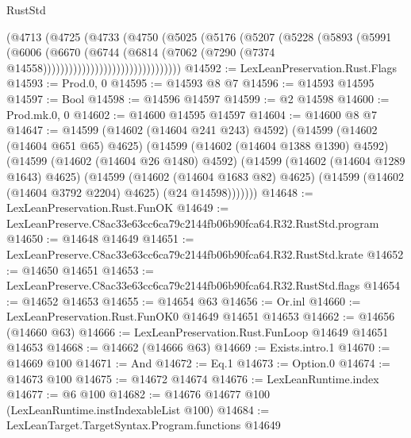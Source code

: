 \begin{lexlean}{RustStd}
\begin{coremodule}
                                  (@4713
                                    (@4725
                                      (@4733
                                        (@4750
                                          (@5025
                                            (@5176
                                              (@5207
                                                (@5228
                                                  (@5893
                                                    (@5991
                                                      (@6006
                                                        (@6670
                                                          (@6744
                                                            (@6814
                                                              (@7062
                                                                (@7290
                                                                  (@7374
                                                                    @14558))))))))))))))))))))))))))))))))
@14592 := LexLeanPreservation.Rust.Flags
@14593 := Prod.{0, 0}
@14595 := @14593 @8 @7
@14596 := @14593 @14595
@14597 := Bool
@14598 := @14596 @14597
@14599 := @2 @14598
@14600 := Prod.mk.{0, 0}
@14602 := @14600 @14595 @14597
@14604 := @14600 @8 @7
@14647 := @14599
    (@14602 (@14604 @241 @243) @4592)
    (@14599
      (@14602 (@14604 @651 @65) @4625)
      (@14599
        (@14602 (@14604 @1388 @1390) @4592)
        (@14599
          (@14602 (@14604 @26 @1480) @4592)
          (@14599
            (@14602 (@14604 @1289 @1643) @4625)
            (@14599
              (@14602 (@14604 @1683 @82) @4625)
              (@14599 (@14602 (@14604 @3792 @2204) @4625) (@24 @14598)))))))
@14648 := LexLeanPreservation.Rust.FunOK
@14649 := LexLeanPreserve.C8ac33e63cc6ca79c2144fb06b90fca64.R32.RustStd.program
@14650 := @14648 @14649
@14651 := LexLeanPreserve.C8ac33e63cc6ca79c2144fb06b90fca64.R32.RustStd.krate
@14652 := @14650 @14651
@14653 := LexLeanPreserve.C8ac33e63cc6ca79c2144fb06b90fca64.R32.RustStd.flags
@14654 := @14652 @14653
@14655 := @14654 @63
@14656 := Or.inl
@14660 := LexLeanPreservation.Rust.FunOK0 @14649 @14651 @14653
@14662 := @14656 (@14660 @63)
@14666 := LexLeanPreservation.Rust.FunLoop @14649 @14651 @14653
@14668 := @14662 (@14666 @63)
@14669 := Exists.intro.{1}
@14670 := @14669 @100
@14671 := And
@14672 := Eq.{1}
@14673 := Option.{0}
@14674 := @14673 @100
@14675 := @14672 @14674
@14676 := LexLeanRuntime.index
@14677 := @6 @100
@14682 := @14676 @14677 @100 (LexLeanRuntime.instIndexableList @100)
@14684 := LexLeanTarget.TargetSyntax.Program.functions @14649

\end{coremodule}
\end{lexlean}
